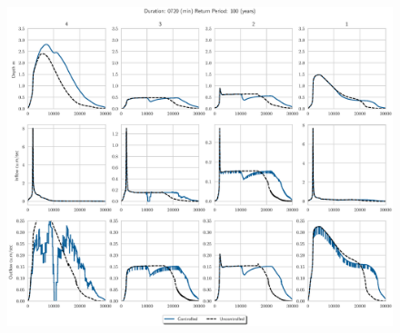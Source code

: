 \begin{figure}
    \centering
    \includegraphics[width=\linewidth]{./RL-SI-figures/77storms/0720100.eps}
\end{figure}



